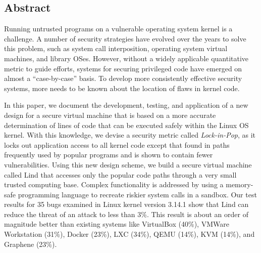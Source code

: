 \subsection*{Abstract}

Running untrusted programs on a vulnerable operating system kernel is a challenge. 
A number of security strategies have evolved over the years to solve this problem, 
such as system call interposition, operating system virtual machines, and library OSes. 
However, without a widely applicable quantitative metric to guide efforts, systems for securing privileged code 
have emerged on almost a ``case-by-case'' basis. To develop more consistently effective security systems, 
more needs to be known about the location of flaws in kernel code.

In this paper, we document the development, testing, and application of a new design for a secure virtual machine 
that is based on a more accurate determination of lines of code that can be executed safely within the Linux OS kernel. 
With this knowledge, we devise a security metric called \emph{Lock-in-Pop}, as it locks out application access to all kernel code 
except that found in paths frequently used by popular programs and is shown to contain fewer vulnerabilities. 
Using this new design scheme, we build a secure virtual machine called Lind that accesses only 
the popular code paths through a very small trusted computing base. Complex functionality is addressed 
by using a memory-safe programming language to recreate riskier system calls in a sandbox. 
Our test results for 35 bugs examined in Linux kernel version 3.14.1 show that Lind can 
reduce the threat of an attack to less than 3\%. 
This result is about an order of magnitude better than existing systems like VirtualBox (40\%), VMWare Workstation (31\%), Docker (23\%), 
LXC (34\%), QEMU (14\%), KVM (14\%), and Graphene (23\%).